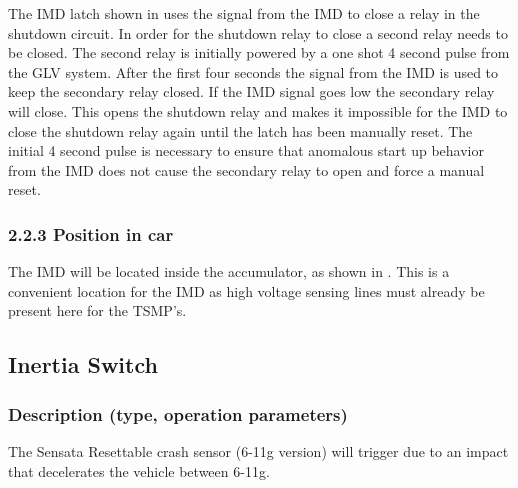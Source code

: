 \documentclass{article}
\begin{document}
The IMD latch shown in  uses the signal from the IMD to close a relay in the shutdown circuit. In order for the shutdown relay to close a second relay needs to be closed. The second relay is initially powered by a one shot 4 second pulse from the GLV system. After the first four seconds the signal from the IMD is used to keep the secondary relay closed. If the IMD signal goes low the secondary relay will close. This opens the shutdown relay and makes it impossible for the IMD to close the shutdown relay again until the latch has been manually reset. The initial 4 second pulse is necessary to ensure that anomalous start up behavior from the IMD does not cause the secondary relay to open and force a manual reset.


\subsubsection*{2.2.3 Position in car}

The IMD will be located inside the accumulator, as shown in . This is a convenient location for the IMD as high voltage sensing lines must already be present here for the TSMP’s.

\subsection{Inertia Switch}\label{inertia_switch}
\subsubsection{Description (type, operation parameters)}
The Sensata Resettable crash sensor (6-11g version) will trigger due to an impact that decelerates the vehicle between 6-11g.
\end{document}
